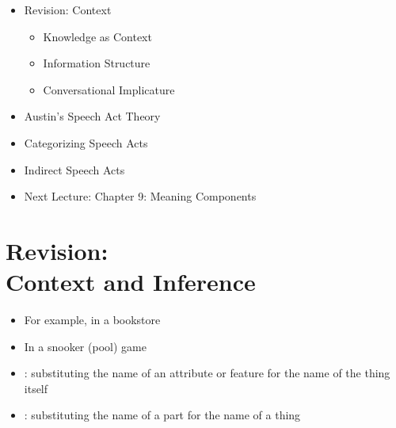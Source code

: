 \documentclass[headrule,footrule]{foils}
\begin{document}
\maketitle

%


\begin{itemize}\addtolength{\itemsep}{-1ex}
\item Revision: Context
  \begin{itemize}
  \item Knowledge as Context
  \item Information Structure
  \item Conversational Implicature
  \end{itemize}
\item Austin's Speech Act Theory
\item Categorizing Speech Acts
\item Indirect Speech Acts
\item Next Lecture: Chapter 9: Meaning Components
\end{itemize}




\section{Revision: \\ Context and Inference}





\begin{itemize}\addtolength{\itemsep}{-1ex}
\item For example, in a bookstore
  \begin{exe}
    \ex {}
  \end{exe}
\item In a snooker (pool)  game
  \begin{exe}
    \ex {}
  \end{exe}
\item {}: substituting the name of an attribute or feature for the name of the thing itself
  \begin{exe}
    \ex {}
    \ex {}
  \end{exe}
  \item {}: substituting the name of a part for the name of a thing
  \begin{exe}
    \ex {}
  \end{exe}
\end{itemize}
\end{document}
